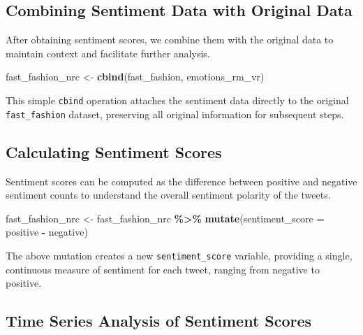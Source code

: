 \documentclass[
]{book}
\newenvironment{Shaded}{\begin{snugshade}}{\end{snugshade}}
\newcommand{\AttributeTok}[1]{\textcolor[rgb]{0.13,0.29,0.53}{#1}}
\newcommand{\FunctionTok}[1]{\textcolor[rgb]{0.13,0.29,0.53}{\textbf{#1}}}
\newcommand{\NormalTok}[1]{#1}
\newcommand{\OtherTok}[1]{\textcolor[rgb]{0.56,0.35,0.01}{#1}}
\newcommand{\SpecialCharTok}[1]{\textcolor[rgb]{0.81,0.36,0.00}{\textbf{#1}}}
\begin{document}
\hypertarget{combining-sentiment-data-with-original-data}{%
\subsection*{Combining Sentiment Data with Original Data}\label{combining-sentiment-data-with-original-data}}

After obtaining sentiment scores, we combine them with the original data to maintain context and facilitate further analysis.

\begin{Shaded}
\begin{Highlighting}[]
\NormalTok{fast\_fashion\_nrc }\OtherTok{\textless{}{-}} \FunctionTok{cbind}\NormalTok{(fast\_fashion, emotions\_rm\_vr)}
\end{Highlighting}
\end{Shaded}

This simple \texttt{cbind} operation attaches the sentiment data directly to the original \texttt{fast\_fashion} dataset, preserving all original information for subsequent steps.

\hypertarget{calculating-sentiment-scores}{%
\subsection*{Calculating Sentiment Scores}\label{calculating-sentiment-scores}}

Sentiment scores can be computed as the difference between positive and negative sentiment counts to understand the overall sentiment polarity of the tweets.

\begin{Shaded}
\begin{Highlighting}[]
\NormalTok{fast\_fashion\_nrc }\OtherTok{\textless{}{-}}\NormalTok{ fast\_fashion\_nrc }\SpecialCharTok{\%\textgreater{}\%}
  \FunctionTok{mutate}\NormalTok{(}\AttributeTok{sentiment\_score =}\NormalTok{ positive }\SpecialCharTok{{-}}\NormalTok{ negative)}
\end{Highlighting}
\end{Shaded}

The above mutation creates a new \texttt{sentiment\_score} variable, providing a single, continuous measure of sentiment for each tweet, ranging from negative to positive.

\hypertarget{time-series-analysis-of-sentiment-scores}{%
\subsection*{Time Series Analysis of Sentiment Scores}\label{time-series-analysis-of-sentiment-scores}}
\end{document}

